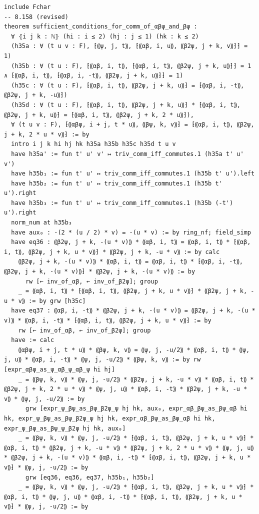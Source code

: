 \begin{Verbatim}
include Fchar
-- 8.158 (revised)
theorem sufficient_conditions_for_comm_of_αβψ_and_βψ :
  ∀ ⦃i j k : ℕ⦄ (hi : i ≤ 2) (hj : j ≤ 1) (hk : k ≤ 2)
  (h35a : ∀ (t u v : F), ⁅⸨ψ, j, t⸩, ⁅⸨αβ, i, u⸩, ⸨β2ψ, j + k, v⸩⁆⁆ = 1)
  (h35b : ∀ (t u : F), ⁅⸨αβ, i, t⸩, ⁅⸨αβ, i, t⸩, ⸨β2ψ, j + k, u⸩⁆⁆ = 1 ∧ ⁅⸨αβ, i, t⸩, ⁅⸨αβ, i, -t⸩, ⸨β2ψ, j + k, u⸩⁆⁆ = 1)
  (h35c : ∀ (t u : F), ⁅⸨αβ, i, t⸩, ⸨β2ψ, j + k, u⸩⁆ = ⁅⸨αβ, i, -t⸩, ⸨β2ψ, j + k, -u⸩⁆)
  (h35d : ∀ (t u : F), ⁅⸨αβ, i, t⸩, ⸨β2ψ, j + k, u⸩⁆ * ⁅⸨αβ, i, t⸩, ⸨β2ψ, j + k, u⸩⁆ = ⁅⸨αβ, i, t⸩, ⸨β2ψ, j + k, 2 * u⸩⁆),
  ∀ (t u v : F), ⁅⸨αβψ, i + j, t * u⸩, ⸨βψ, k, v⸩⁆ = ⁅⸨αβ, i, t⸩, ⸨β2ψ, j + k, 2 * u * v⸩⁆ := by
  intro i j k hi hj hk h35a h35b h35c h35d t u v
  have h35a' := fun t' u' v' ↦ triv_comm_iff_commutes.1 (h35a t' u' v')
  have h35b₁ := fun t' u' ↦ triv_comm_iff_commutes.1 (h35b t' u').left
  have h35b₂ := fun t' u' ↦ triv_comm_iff_commutes.1 (h35b t' u').right
  have h35b₃ := fun t' u' ↦ triv_comm_iff_commutes.1 (h35b (-t') u').right
  norm_num at h35b₃
  have aux₀ : -(2 * (u / 2) * v) = -(u * v) := by ring_nf; field_simp
  have eq36 : ⸨β2ψ, j + k, -(u * v)⸩ * ⸨αβ, i, t⸩ = ⸨αβ, i, t⸩ * ⁅⸨αβ, i, t⸩, ⸨β2ψ, j + k, u * v⸩⁆ * ⸨β2ψ, j + k, -u * v⸩ := by calc
    ⸨β2ψ, j + k, -(u * v)⸩ * ⸨αβ, i, t⸩ = ⸨αβ, i, t⸩ * ⁅⸨αβ, i, -t⸩, ⸨β2ψ, j + k, -(u * v)⸩⁆ * ⸨β2ψ, j + k, -(u * v)⸩ := by
      rw [← inv_of_αβ, ← inv_of_β2ψ]; group
    _ = ⸨αβ, i, t⸩ * ⁅⸨αβ, i, t⸩, ⸨β2ψ, j + k, u * v⸩⁆ * ⸨β2ψ, j + k, -u * v⸩ := by grw [h35c]
  have eq37 : ⸨αβ, i, -t⸩ * ⸨β2ψ, j + k, -(u * v)⸩ = ⸨β2ψ, j + k, -(u * v)⸩ * ⸨αβ, i, -t⸩ * ⁅⸨αβ, i, t⸩, ⸨β2ψ, j + k, u * v⸩⁆ := by
    rw [← inv_of_αβ, ← inv_of_β2ψ]; group
  have := calc
    ⸨αβψ, i + j, t * u⸩ * ⸨βψ, k, v⸩ = ⸨ψ, j, -u/2⸩ * ⸨αβ, i, t⸩ * ⸨ψ, j, u⸩ * ⸨αβ, i, -t⸩ * ⸨ψ, j, -u/2⸩ * ⸨βψ, k, v⸩ := by rw [expr_αβψ_as_ψ_αβ_ψ_αβ_ψ hi hj]
    _ = ⸨βψ, k, v⸩ * ⸨ψ, j, -u/2⸩ * ⸨β2ψ, j + k, -u * v⸩ * ⸨αβ, i, t⸩ * ⸨β2ψ, j + k, 2 * u * v⸩ * ⸨ψ, j, u⸩ * ⸨αβ, i, -t⸩ * ⸨β2ψ, j + k, -u * v⸩ * ⸨ψ, j, -u/2⸩ := by
      grw [expr_ψ_βψ_as_βψ_β2ψ_ψ hj hk, aux₀, expr_αβ_βψ_as_βψ_αβ hi hk, expr_ψ_βψ_as_βψ_β2ψ_ψ hj hk, expr_αβ_βψ_as_βψ_αβ hi hk, expr_ψ_βψ_as_βψ_ψ_β2ψ hj hk, aux₀]
    _ = ⸨βψ, k, v⸩ * ⸨ψ, j, -u/2⸩ * ⁅⸨αβ, i, t⸩, ⸨β2ψ, j + k, u * v⸩⁆ * ⸨αβ, i, t⸩ * ⸨β2ψ, j + k, -u * v⸩ * ⸨β2ψ, j + k, 2 * u * v⸩ * ⸨ψ, j, u⸩ * ⸨β2ψ, j + k, -(u * v)⸩ * ⸨αβ, i, -t⸩ * ⁅⸨αβ, i, t⸩, ⸨β2ψ, j + k, u * v⸩⁆ * ⸨ψ, j, -u/2⸩ := by
      grw [eq36, eq36, eq37, h35b₁, h35b₂]
    _ = ⸨βψ, k, v⸩ * ⸨ψ, j, -u/2⸩ * ⁅⸨αβ, i, t⸩, ⸨β2ψ, j + k, u * v⸩⁆ * ⸨αβ, i, t⸩ * ⸨ψ, j, u⸩ * ⸨αβ, i, -t⸩ * ⁅⸨αβ, i, t⸩, ⸨β2ψ, j + k, u * v⸩⁆ * ⸨ψ, j, -u/2⸩ := by

\end{Verbatim}
